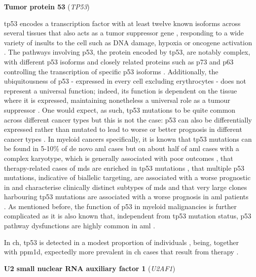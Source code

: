 \noindent \textbf{Tumor protein 53} (\textit{TP53})

\Ac{tp53} encodes a transcription factor with at least twelve known isoforms across several tissues \cite{Khoury2011-yk,Bourdon2005-ne} that also acts as a tumor suppressor gene \cite{Surget2013-xh}, responding to a wide variety of insults to the cell such as DNA damage, hypoxia or oncogene activation \cite{Oren2003-gg}. The pathways involving p53, the protein encoded by \ac{tp53}, are notably complex, with different p53 isoforms and closely related proteins such as p73 and p63 controlling the transcription of specific p53 isoforms \cite{Bourdon2005-ne}. Additionally, the ubiquitousness of p53 - expressed in every cell excluding erythrocytes - does not represent a universal function; indeed, its function is dependent on the tissue where it is expressed, maintaining nonetheless a universal role as a tumour suppressor \cite{Surget2013-xh}. One would expect, as such, \ac{tp53} mutations to be quite common across different cancer types but this is not the case: p53 can also be differentially expressed rather than mutated to lead to worse or better prognosis in different cancer types \cite{Bourdon2011-hc,Song2009-oq,Surget2013-xh}. In myeloid cancers specifically, it is known that \ac{tp53} mutations can be found in 5-10\% of de novo \ac{aml} cases but on about half of \ac{aml} cases with a complex karyotype, which is generally associated with poor outcomes \cite{Hou2015-jz,Rucker2012-oj,Bowen2009-ep}, that therapy-related cases of \ac{mds} are enriched in \ac{tp53} mutations \cite{Wong2015-ki}, that multiple p53 mutations, indicative of biallelic targeting, are associated with a worse prognostic in and characterise clinically distinct subtypes of \ac{mds} \cite{Bernard2020-fj} and that very large clones harbouring \ac{tp53} mutations are associated with a worse prognosis in \ac{aml} patients \cite{Short2020-qu}. As mentioned before, the function of p53 in myeloid malignancies is further complicated as it is also known that, independent from \ac{tp53} mutation status, p53 pathway dysfunctions are highly common in \ac{aml} \cite{Quintas-Cardama2017-tj,Abramowitz2017-lg}.

In \ac{ch}, \ac{tp53} is detected in a modest proportion of individuals \cite{Jaiswal2014-rl,Bolton2020-ct,Genovese2014-eu,Xie2014-np,Zink2017-zi}, being, together with \ac{ppm1d}, expectedly more prevalent in \ac{ch} cases that result from therapy \cite{Zehir2017-gh}.

\noindent \textbf{U2 small nuclear RNA auxiliary factor 1} (\textit{U2AF1})

